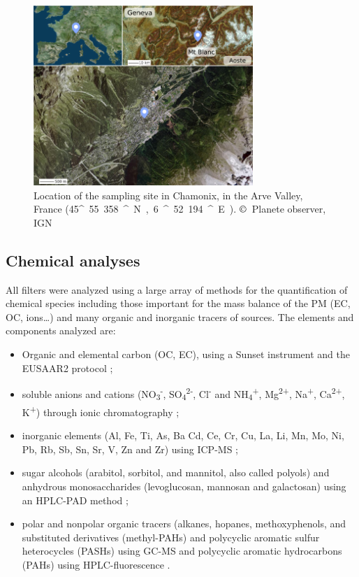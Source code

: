 \documentclass[acp, manuscript]{copernicus}
\begin{document}
\begin{figure}[h]
    \centering
    \includegraphics[width=8.3cm]{figures/fig01.png}
    \caption{Location of the sampling site in Chamonix, in the Arve Valley,
    France (45\unit{^\circ}55.358\unit{^\prime}~N,
6\unit{^\circ}52.194\unit{^\prime}~E).  $\copyright$~Planete observer, IGN}
    \label{fig:cham}
\end{figure}

\subsection{Chemical analyses }\label{chemical-analyses}

All filters were analyzed using a large array of methods for the quantification
of chemical species including those important for the mass balance of the PM
(EC, OC, ions\ldots{}) and many organic and inorganic tracers of
sources. The elements and components analyzed are:

\begin{itemize}
\item
  Organic and elemental carbon (OC, EC), using a Sunset instrument and
  the EUSAAR2 protocol \citep{aymoz_evolution_2004,cavalli_european_2016};
\item
  soluble anions and cations (NO\textsubscript{3}\textsuperscript{-},
  SO\textsubscript{4}\textsuperscript{2-}, Cl\textsuperscript{-} and
  NH\textsubscript{4}\textsuperscript{+}, Mg\textsuperscript{2+},
  Na\textsuperscript{+}, Ca\textsuperscript{2+}, K\textsuperscript{+})
  through ionic chromatography \citep{waked_source_2014};
\item
  inorganic elements (Al, Fe, Ti, As, Ba Cd, Ce, Cr, Cu, La, Li, Mn, Mo,
  Ni, Pb, Rb, Sb, Sn, Sr, V, Zn and Zr) using ICP-MS \citep{waked_source_2014};
\item
  sugar alcohols (arabitol, sorbitol, and mannitol, also called polyols)
  and anhydrous monosaccharides (levoglucosan, mannosan and galactosan)
  using an HPLC-PAD method \citep{waked_source_2014};
\item
  polar and nonpolar organic tracers (alkanes, hopanes, methoxyphenols,
  and substituted derivatives (methyl-PAHs) and polycyclic aromatic
  sulfur heterocycles (PASHs) using GC-MS and polycyclic aromatic
  hydrocarbons (PAHs) using HPLC-fluorescence \citep{golly_large_2015}.
\end{itemize}
\end{document}
